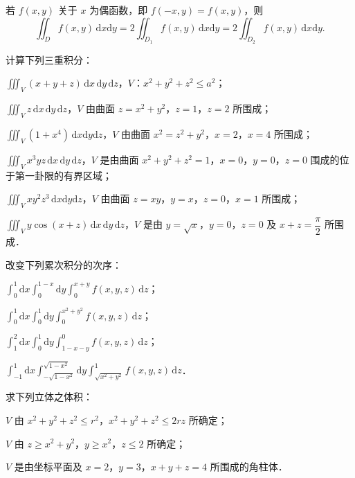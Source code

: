 \begin{xiti}
\begin{ziti}
\[\]
\item 若 $f(x,y)$ 关于 $x$ 为偶函数，即 $f(-x,y)=f(x,y)$，则
\[
\iint_{D}f(x,y)\,\mathrm{d}x\mathrm{d}y=2\iint_{D_{1}}f(x,y)\,\mathrm{d}x\mathrm{d}y=2\iint_{D_{2}}f(x,y)\,\mathrm{d}x\mathrm{d}y.
\]
\end{ziti}
\item 计算下列三重积分：
\begin{ziti}
\item $\displaystyle\iiint_{V}(x+y+z)\,\mathrm{d}x\,\mathrm{d}y\,\mathrm{d}z$，$V$：$x^{2}+y^{2}+z^{2}\leqslant a^{2}$；
\item $\displaystyle\iiint_{V}z\,\mathrm{d}x\,\mathrm{d}y\,\mathrm{d}z$，$V$ 由曲面 $z=x^{2}+y^{2}$，$z=1$，$z=2$ 所围成；
\item $\displaystyle\iiint_{V}(1+x^{4})\,\mathrm{d}x\mathrm{d}y\mathrm{d}z$，$V$ 由曲面 $x^{2}=z^{2}+y^{2}$，$x=2$，$x=4$ 所围成；
\item $\displaystyle\iiint_{V}x^{3}yz\,\mathrm{d}x\,\mathrm{d}y\,\mathrm{d}z$，$V$ 是由曲面 $x^{2}+y^{2}+z^{2}=1$，$x=0$，$y=0$，$z=0$ 围成的位于第一卦限的有界区域；
\item $\displaystyle\iiint_{V}xy^{2}z^{3}\,\mathrm{d}x\mathrm{d}y\mathrm{d}z$，$V$ 由曲面 $z=xy$，$y=x$，$z=0$，$x=1$ 所围成；
\item $\displaystyle\iiint_{V}y\cos(x+z)\,\mathrm{d}x\,\mathrm{d}y\,\mathrm{d}z$，$V$ 是由 $y=\sqrt{x}$，$y=0$，$z=0$ 及 $x+z=\dfrac{\pi}{2}$ 所围成．
\end{ziti}
\item 改变下列累次积分的次序：
\begin{ziti}
\item $\displaystyle\int_{0}^{1}\mathrm{d}x\int_{0}^{1-x}\mathrm{d}y\int_{0}^{x+y}f(x,y,z)\,\mathrm{d}z$；
\item $\displaystyle\int_{0}^{1}\mathrm{d}x\int_{0}^{1}\mathrm{d}y\int_{0}^{x^{2}+y^{2}}f(x,y,z)\,\mathrm{d}z$；
\item $\displaystyle\int_{1}^{2}\mathrm{d}x\int_{0}^{1}\mathrm{d}y\int_{1-x-y}^{0}f(x,y,z)\,\mathrm{d}z$；
\item $\displaystyle\int_{-1}^{1}\mathrm{d}x\int_{-\sqrt{1-x^{2}}}^{\sqrt{1-x^{2}}}\mathrm{d}y\int_{\sqrt{x^{2}+y^{2}}}^{1}f(x,y,z)\,\mathrm{d}z$．
\end{ziti}
\item 求下列立体之体积：
\begin{ziti}
\item $V$ 由 $x^{2}+y^{2}+z^{2}\leqslant r^{2}$，$x^{2}+y^{2}+z^{2}\leqslant 2rz$ 所确定；
\item $V$ 由 $z\geqslant x^{2}+y^{2}$，$y\geqslant x^{2}$，$z\leqslant 2$ 所确定；
\item $V$ 是由坐标平面及 $x=2$，$y=3$，$x+y+z=4$ 所围成的角柱体．
\end{ziti}
\end{xiti}

